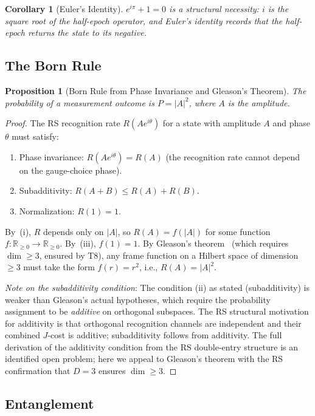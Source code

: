 \documentclass[12pt,a4paper]{article}
\newtheorem{corollary}[theorem]{Corollary}
\newtheorem{proposition}[theorem]{Proposition}
\theoremstyle{definition}
\theoremstyle{remark}
\begin{document}
\begin{corollary}[Euler's Identity]
$e^{i\pi} + 1 = 0$ is a structural necessity: $i$ is the square root
of the half-epoch operator, and Euler's identity records that the
half-epoch returns the state to its negative.
\end{corollary}

\subsection{The Born Rule}

\begin{proposition}[Born Rule from Phase Invariance and Gleason's Theorem]
The probability of a measurement outcome is $P = |A|^2$, where $A$ is
the amplitude.
\end{proposition}

\begin{proof}
The RS recognition rate $R(Ae^{i\theta})$ for a state with amplitude
$A$ and phase $\theta$ must satisfy:
\begin{enumerate}[label=(\roman*)]
  \item Phase invariance: $R(Ae^{i\theta}) = R(A)$ (the recognition
  rate cannot depend on the gauge-choice phase).
  \item Subadditivity: $R(A+B) \leq R(A) + R(B)$.
  \item Normalization: $R(1) = 1$.
\end{enumerate}
By~(i), $R$ depends only on $|A|$, so $R(A) = f(|A|)$ for some
function $f: \mathbb{R}_{\geq 0} \to \mathbb{R}_{\geq 0}$.
By~(iii), $f(1) = 1$.  By Gleason's theorem~\cite{Gleason1957}
(which requires $\dim \geq 3$, ensured by T8), any frame function
on a Hilbert space of dimension $\geq 3$ must take the form
$f(r) = r^2$, i.e., $R(A) = |A|^2$.

\emph{Note on the subadditivity condition}: The condition (ii) as stated
(subadditivity) is weaker than Gleason's actual hypotheses, which require
the probability assignment to be \emph{additive} on orthogonal subspaces.
The RS structural motivation for additivity is that orthogonal recognition
channels are independent and their combined $J$-cost is additive;
subadditivity follows from additivity.  The full derivation of the
additivity condition from the RS double-entry structure is an identified
open problem; here we appeal to Gleason's theorem with the RS confirmation
that $D = 3$ ensures $\dim \geq 3$.
\end{proof}

\subsection{Entanglement}
\end{document}
